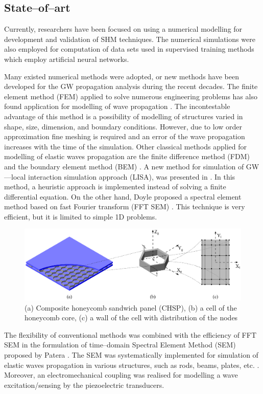 \documentclass[a4paper,12pt]{article}
\begin{document}
\subsection{State--of--art}
Currently, researchers have been focused on using a numerical modelling for development and validation of SHM techniques. The numerical simulations were also employed for computation of data sets used in supervised training methods which employ artificial neural networks.

Many existed numerical methods were adopted, or new methods have been developed for the GW propagation analysis during the recent decades. The finite element method (FEM) applied to solve numerous engineering problems has also found application for modelling of wave propagation \cite{talbot1975finite, koshiba1984finite}. The incontestable advantage of this method is a possibility of modelling of structures varied in shape, size, dimension, and boundary conditions. However, due to low order approximation fine meshing is required and an error of the wave propagation increases with the time of the simulation. Other classical methods applied for modelling of elastic waves propagation are the finite difference method (FDM) \cite{strikwerda1989finite} and the boundary element method (BEM) \cite{brebbia2012boundary}. A new method for simulation of GW---local interaction simulation approach (LISA), was presented in \cite{delsanto1992connection}. In this method, a heuristic approach is implemented instead of solving a finite differential equation. On the other hand, Doyle proposed a spectral element method based on fast Fourier transform (FFT SEM) \cite{doyle1989wave}. This technique is very efficient, but it is limited to simple 1D problems.

\begin{figure}
\includegraphics[width=1\textwidth]{../Figures/honeycomb.eps}
	\caption{(a) Composite honeycomb sandwich panel (CHSP), (b) a cell of the honeycomb core, (c) a wall of the cell with distribution of the nodes}
	\label{fig:honeycomb}
\end{figure}
The flexibility of conventional methods was combined with the efficiency of FFT SEM in the formulation of time--domain Spectral Element Method (SEM) proposed by Patera \cite{patera1984spectral}. The SEM was systematically implemented for simulation of elastic waves propagation in various structures, such as rods, beams, plates, etc. \cite{kudela2007modelling, kim2008time, peng2009modeling, ha2009optimizing, schulte2010spectral, rucka2011modelling, ostachowicz2011guided, zak2012damage, ge2014accurate}. Moreover, an electromechanical coupling was realised for modelling a wave excitation/sensing by the piezoelectric transducers.
 
\end{document}
